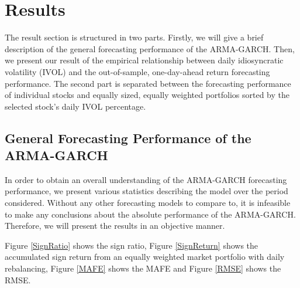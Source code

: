 \chapter{Results}
\label{Results}
The result section is structured in two parts. Firstly, we will give a brief description of the general forecasting performance of the ARMA-GARCH. Then, we present our result of the empirical relationship between daily idiosyncratic volatility (IVOL) and the out-of-sample, one-day-ahead return forecasting performance. The second part is separated between the forecasting performance of individual stocks and equally sized, equally weighted portfolios sorted by the selected stock's daily IVOL percentage.

\section{General Forecasting Performance of the ARMA-GARCH}
In order to obtain an overall understanding of the ARMA-GARCH forecasting performance, we present various statistics describing the model over the period considered. Without any other forecasting models to compare to, it is infeasible to make any conclusions about the absolute performance of the ARMA-GARCH. Therefore, we will present the results in an objective manner.

Figure \ref{SignRatio} shows the sign ratio, Figure \ref{SignReturn} shows the accumulated sign return from an equally weighted market portfolio with daily rebalancing, Figure \ref{MAFE} shows the MAFE and Figure \ref{RMSE} shows the RMSE.

